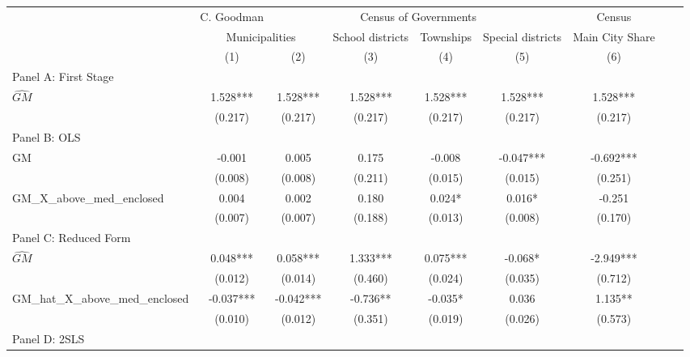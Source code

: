  \begin{tabular}{l*{8}{c}} \toprule
&\multicolumn{1}{c}{C. Goodman}&\multicolumn{4}{c}{Census of Governments}&\multicolumn{1}{c}{Census}\\\cmidrule(lr){2-2}\cmidrule(lr){3-6}\cmidrule(lr){7-7}
&\multicolumn{2}{c}{Municipalities}&\multicolumn{1}{c}{School districts}&\multicolumn{1}{c}{Townships}&\multicolumn{1}{c}{Special districts}&\multicolumn{1}{c}{Main City Share}\\\cmidrule(lr){2-3}\cmidrule(lr){4-6}\cmidrule(lr){7-7}
&\multicolumn{1}{c}{(1)}&\multicolumn{1}{c}{(2)}&\multicolumn{1}{c}{(3)}&\multicolumn{1}{c}{(4)}&\multicolumn{1}{c}{(5)}&\multicolumn{1}{c}{(6)}\\
\cmidrule(lr){1-7}
\multicolumn{6}{l}{Panel A: First Stage}\\
\cmidrule(lr){1-7}
$\widehat{GM}$  &    1.528***&    1.528***&    1.528***&    1.528***&    1.528***&    1.528***\\
                &  (0.217)   &  (0.217)   &  (0.217)   &  (0.217)   &  (0.217)   &  (0.217)   \\
\cmidrule(lr){1-7}
\multicolumn{6}{l}{Panel B: OLS}\\
\cmidrule(lr){1-7}
GM              &   -0.001   &    0.005   &    0.175   &   -0.008   &   -0.047***&   -0.692***\\
                &  (0.008)   &  (0.008)   &  (0.211)   &  (0.015)   &  (0.015)   &  (0.251)   \\
\addlinespace
GM\_X\_above\_med\_enclosed&    0.004   &    0.002   &    0.180   &    0.024*  &    0.016*  &   -0.251   \\
                &  (0.007)   &  (0.007)   &  (0.188)   &  (0.013)   &  (0.008)   &  (0.170)   \\
\cmidrule(lr){1-7}
\multicolumn{6}{l}{Panel C: Reduced Form}\\
\cmidrule(lr){1-7}
$\widehat{GM}$  &    0.048***&    0.058***&    1.333***&    0.075***&   -0.068*  &   -2.949***\\
                &  (0.012)   &  (0.014)   &  (0.460)   &  (0.024)   &  (0.035)   &  (0.712)   \\
\addlinespace
GM\_hat\_X\_above\_med\_enclosed&   -0.037***&   -0.042***&   -0.736** &   -0.035*  &    0.036   &    1.135** \\
                &  (0.010)   &  (0.012)   &  (0.351)   &  (0.019)   &  (0.026)   &  (0.573)   \\
\cmidrule(lr){1-7}
\multicolumn{6}{l}{Panel D: 2SLS}\\

\end{tabular}
